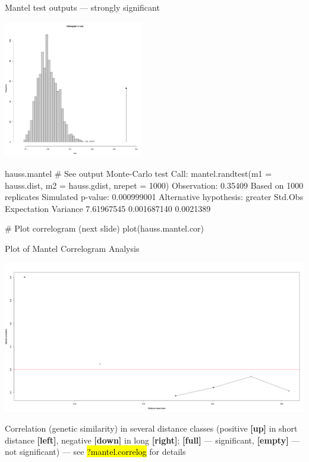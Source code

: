 \documentclass[compress, ucs, xelatex, 11pt, xcolor=svgnames,
  hyperref={
    bookmarks=true,
    unicode=true,
    colorlinks=true,
    pdftitle={Molecular data in R},
    plainpages=false,
    pdfauthor={Vojtech Zeisek},
    pdfsubject={Course about phylogeny and evolution in R},
    pdfcreator={XeLaTeX},
    pdfkeywords={R, evolution, phylogeny, molecular data},
    linkcolor=Tomato,
    anchorcolor=SaddleBrown,
    citecolor=Goldenrod,
    filecolor=DarkMagenta,
    menucolor=Sienna,
    urlcolor=DarkTurquoise,
    pdftex},
  url={hyphens, lowtilde} %
  ]{beamer}
\renewcommand{\texttt}[1]{\hl{\ttfamily #1}}
\begin{document}
\begin{frame}[fragile]{Mantel test outputs --- strongly significant}
\begin{multicols}{2}
  \includegraphics[height=6cm]{mantel.png}
  \begin{spluscode}
    hauss.mantel # See output
    Monte-Carlo test
    Call: mantel.randtest(m1 =
      hauss.dist, m2 =
      hauss.gdist, nrepet = 1000)
    Observation: 0.35409
    Based on 1000 replicates
    Simulated p-value: 0.000999001
    Alternative hypothesis: greater
      Std.Obs Expectation  Variance
    7.61967545 0.001687140 0.0021389
  \end{spluscode}
  \vfill
  \begin{spluscode}
    # Plot correlogram (next slide)
    plot(hauss.mantel.cor)
  \end{spluscode}
\end{multicols}
\end{frame}

\begin{frame}{Plot of Mantel Correlogram Analysis}
  \vfil
  \begin{center}
    \includegraphics[width=\textwidth-1cm]{mantel-cor.png}
  \end{center}
  \vfil
  Correlation (genetic similarity) in several distance classes (positive \textbf{[up]} in short distance \textbf{[left]}, negative \textbf{[down]} in long \textbf{[right]}; \textbf{[full]} --- significant, \textbf{[empty]} --- not significant) --- see \texttt{?mantel.correlog} for details
  \vfill
\end{frame}
\end{document}

